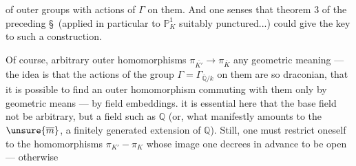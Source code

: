 of outer  groups with actions of $\Gamma$ on them. And one senses that theorem 3 of the preceding \S\ (applied in particular to $\mathbb P_K^1$ suitably punctured...) could give the key to such a construction.

Of  course, arbitrary outer homomorphisms $\pi_{\overline{K'}}\longrightarrow\pi_{\overline K}$  any geometric meaning --- the idea is that the actions of the group $\Gamma=\Gamma_{\overline{\mathbb Q}/k}$ on them are so draconian, that it is possible to find an outer homomorphism commuting with them only by geometric means --- by field embeddings.  it is essential here that the base field not be arbitrary, but a field such as $\mathbb Q$ (or, what manifestly amounts to the $\unsure{\overline m}$, a finitely generated extension of $\mathbb Q$). Still, one must restrict oneself to the homomorphisms $\pi_{K'}-\pi_K$ whose image one decrees in advance to be open --- otherwise
